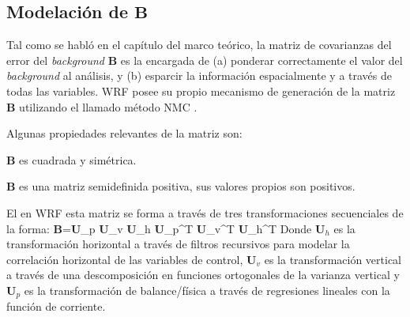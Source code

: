 \subsection{Modelación de $\textbf{B}$}
Tal como se habló en el capítulo del marco teórico, la matriz de covarianzas del error del \emph{background} $\textbf{B}$ es la encargada de (a) ponderar correctamente el valor del \emph{background} al análisis, y (b) esparcir la información espacialmente y a través de todas las variables. WRF posee su propio mecanismo de generación de la matriz $\textbf{B}$ utilizando el llamado método NMC \citep{https://doi.org/10.5065/d68s4mvh}.

Algunas propiedades relevantes de la matriz son:
\begin{itemize*}
	\item $\textbf{B}$ es cuadrada y simétrica.
	\item $\textbf{B}$ es una matriz semidefinida positiva, sus valores propios son positivos. 
\end{itemize*}

El en WRF esta matriz se forma a través de tres transformaciones secuenciales de la forma:
\be 
\textbf{B}=\textbf{U}_p \textbf{U}_v \textbf{U}_h \textbf{U}_p^T \textbf{U}_v^T \textbf{U}_h^T 
\ee
Donde $\textbf{U}_h$ es la transformación horizontal a través de filtros recursivos para modelar la correlación horizontal de las variables de control, $\textbf{U}_v$ es la transformación vertical a través de una descomposición en funciones ortogonales de la varianza vertical y $\textbf{U}_p$ es la transformación de balance/física a través de regresiones lineales con la función de corriente.